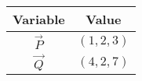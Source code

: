 \begin{tabular}{|c|c|}
\hline
\textbf{Variable} & \textbf{Value} \\
\hline
$\Vec{P}$ & $(1,2,3)$ \\
\hline
$\vec{Q}$ & $(4,2,7)$ \\
\hline
\end{tabular}